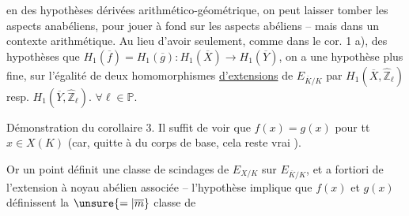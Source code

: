  en des hypothèses dérivées  arithmético-géométrique, on peut laisser tomber les aspects anabéliens, pour jouer à fond sur les aspects abéliens -- mais dans un contexte arithmétique. Au lieu d'avoir  seulement, comme dans le cor. 1 a), des hypothèses que $H_1(\overline f)=H_1(\overline g):H_1(\overline X)\longrightarrow H_1(\overline Y)$, on a une hypothèse plus fine, sur l'égalité de deux homomorphismes \uline{d'extensions} de $E_{\overline K/K}$ par $H_1(\overline X,\widehat{\mathbb Z}_\ell)$ resp. $H_1(\overline Y,\widehat{\mathbb Z}_\ell)$. $\forall\ell\in\mathbb P$.

Démonstration du corollaire 3.
Il suffit de voir que $f(x)=g(x)$ pour tt $x\in X(K)$ (car, quitte à   du corps de base, cela reste vrai  ). 

Or un point définit une classe de   scindages de $E_{X/K}$ sur $E_{\overline K/K}$, et a fortiori de l'extension à noyau abélien associée -- l'hypothèse implique que $f(x)$ et $g(x)$ définissent la $\unsure{=|\overline m}$ classe de
